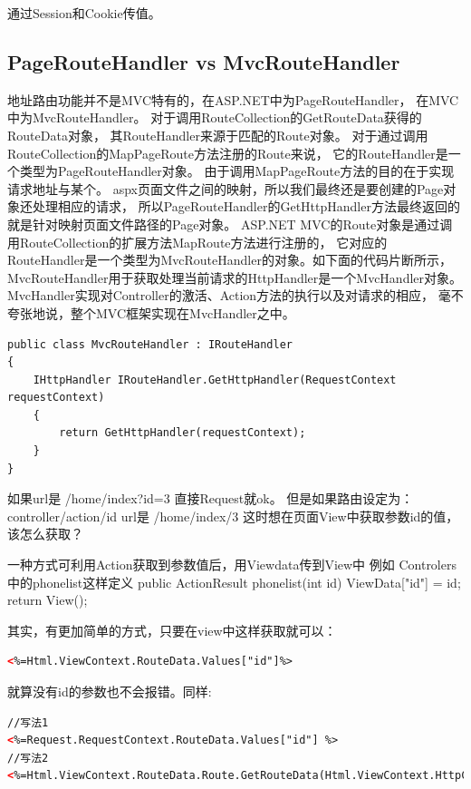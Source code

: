 \documentclass{book}
\begin{document}
通过Session和Cookie传值。

\subsection{PageRouteHandler vs MvcRouteHandler}

地址路由功能并不是MVC特有的，在ASP.NET中为PageRouteHandler，
在MVC中为MvcRouteHandler。
对于调用RouteCollection的GetRouteData获得的RouteData对象，
其RouteHandler来源于匹配的Route对象。
对于通过调用RouteCollection的MapPageRoute方法注册的Route来说，
它的RouteHandler是一个类型为PageRouteHandler对象。
由于调用MapPageRoute方法的目的在于实现请求地址与某个。
aspx页面文件之间的映射，所以我们最终还是要创建的Page对象还处理相应的请求，
所以PageRouteHandler的GetHttpHandler方法最终返回的就是针对映射页面文件路径的Page对象。
ASP.NET MVC的Route对象是通过调用RouteCollection的扩展方法MapRoute方法进行注册的，
它对应的RouteHandler是一个类型为MvcRouteHandler的对象。如下面的代码片断所示，
MvcRouteHandler用于获取处理当前请求的HttpHandler是一个MvcHandler对象。
MvcHandler实现对Controller的激活、Action方法的执行以及对请求的相应，
毫不夸张地说，整个MVC框架实现在MvcHandler之中。

\begin{lstlisting}[language={[Sharp]C}]
public class MvcRouteHandler : IRouteHandler
{
	IHttpHandler IRouteHandler.GetHttpHandler(RequestContext requestContext)
	{
		return GetHttpHandler(requestContext);
	}
}
\end{lstlisting}

如果url是 /home/index?id=3 直接Request就ok。
但是如果路由设定为：{controller}/{action}/{id} 
url是 /home/index/3   
这时想在页面View中获取参数id的值，该怎么获取？
 
一种方式可利用Action获取到参数值后，用Viewdata传到View中
例如
Controlers中的phonelist这样定义  
public ActionResult phonelist(int id)  
  {  
  ViewData["id"] = id;   
  return View();  
  }  

其实，有更加简单的方式，只要在view中这样获取就可以：

\begin{lstlisting}[language=HTML]
<%=Html.ViewContext.RouteData.Values["id"]%>
\end{lstlisting}

就算没有id的参数也不会报错。同样:

\begin{lstlisting}[language=HTML]
//写法1
<%=Request.RequestContext.RouteData.Values["id"] %>
//写法2
<%=Html.ViewContext.RouteData.Route.GetRouteData(Html.ViewContext.HttpContext).Values["id"]%>
\end{lstlisting}
\end{document}
